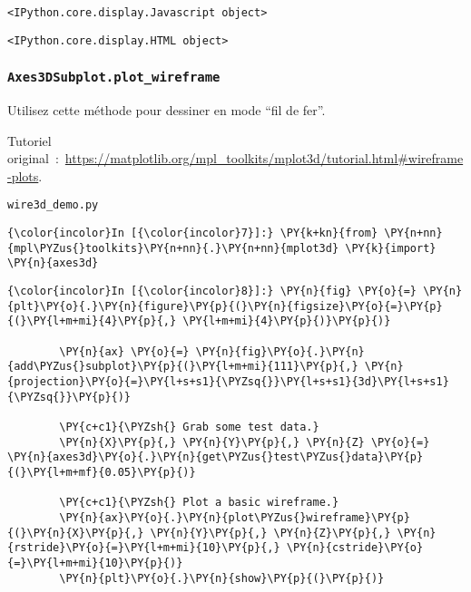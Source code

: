     
    \begin{verbatim}
<IPython.core.display.Javascript object>
    \end{verbatim}

    
    
    \begin{verbatim}
<IPython.core.display.HTML object>
    \end{verbatim}

    
    \hypertarget{axes3dsubplot.plot_wireframe}{%
\subsubsection{\texorpdfstring{\texttt{Axes3DSubplot.plot\_wireframe}}{Axes3DSubplot.plot\_wireframe}}\label{axes3dsubplot.plot_wireframe}}

    Utilisez cette méthode pour dessiner en mode ``fil de fer''.

    Tutoriel
original~:~\url{https://matplotlib.org/mpl_toolkits/mplot3d/tutorial.html\#wireframe-plots}.

    \texttt{wire3d\_demo.py}

    \begin{Verbatim}[commandchars=\\\{\},frame=single,framerule=0.3mm,rulecolor=\color{cellframecolor}]
{\color{incolor}In [{\color{incolor}7}]:} \PY{k+kn}{from} \PY{n+nn}{mpl\PYZus{}toolkits}\PY{n+nn}{.}\PY{n+nn}{mplot3d} \PY{k}{import} \PY{n}{axes3d}
\end{Verbatim}


    \begin{Verbatim}[commandchars=\\\{\},frame=single,framerule=0.3mm,rulecolor=\color{cellframecolor}]
{\color{incolor}In [{\color{incolor}8}]:} \PY{n}{fig} \PY{o}{=} \PY{n}{plt}\PY{o}{.}\PY{n}{figure}\PY{p}{(}\PY{n}{figsize}\PY{o}{=}\PY{p}{(}\PY{l+m+mi}{4}\PY{p}{,} \PY{l+m+mi}{4}\PY{p}{)}\PY{p}{)}
        
        \PY{n}{ax} \PY{o}{=} \PY{n}{fig}\PY{o}{.}\PY{n}{add\PYZus{}subplot}\PY{p}{(}\PY{l+m+mi}{111}\PY{p}{,} \PY{n}{projection}\PY{o}{=}\PY{l+s+s1}{\PYZsq{}}\PY{l+s+s1}{3d}\PY{l+s+s1}{\PYZsq{}}\PY{p}{)}
        
        \PY{c+c1}{\PYZsh{} Grab some test data.}
        \PY{n}{X}\PY{p}{,} \PY{n}{Y}\PY{p}{,} \PY{n}{Z} \PY{o}{=} \PY{n}{axes3d}\PY{o}{.}\PY{n}{get\PYZus{}test\PYZus{}data}\PY{p}{(}\PY{l+m+mf}{0.05}\PY{p}{)}
        
        \PY{c+c1}{\PYZsh{} Plot a basic wireframe.}
        \PY{n}{ax}\PY{o}{.}\PY{n}{plot\PYZus{}wireframe}\PY{p}{(}\PY{n}{X}\PY{p}{,} \PY{n}{Y}\PY{p}{,} \PY{n}{Z}\PY{p}{,} \PY{n}{rstride}\PY{o}{=}\PY{l+m+mi}{10}\PY{p}{,} \PY{n}{cstride}\PY{o}{=}\PY{l+m+mi}{10}\PY{p}{)}
        \PY{n}{plt}\PY{o}{.}\PY{n}{show}\PY{p}{(}\PY{p}{)}
\end{Verbatim}


